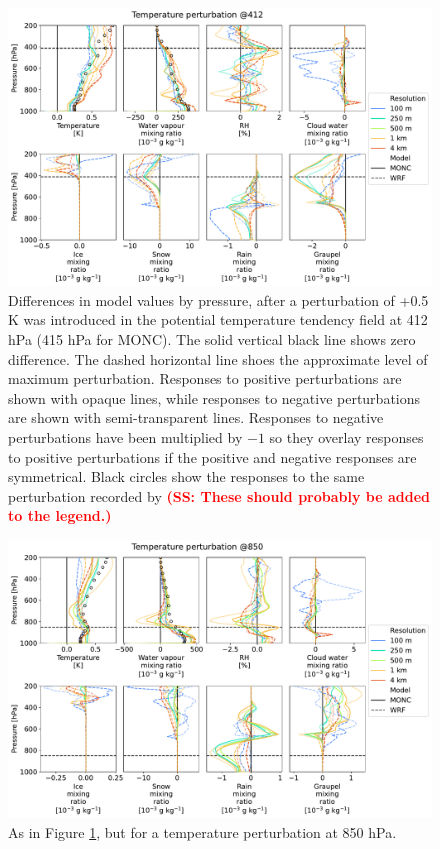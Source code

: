 \documentclass[draft]{agujournal2019}
\newcommand{\todo}[1]{\textcolor{red}{\textbf{(#1)}}}
\begin{document}
\begin{figure}[pth]
    \noindent\includegraphics[width=\textwidth]{figures/pert_diffs_T_0.5_@412}
    \caption{Differences in model values by pressure, after a perturbation of
    +0.5 K was introduced in the potential temperature tendency field at 412 hPa
    (415 hPa for MONC). The solid vertical black line shows zero difference. The
    dashed horizontal line shoes the approximate level of maximum perturbation.
    Responses to positive perturbations are shown with opaque lines, while
    responses to negative perturbations are shown with semi-transparent lines.
    Responses to negative perturbations have been multiplied by $-1$ so they
    overlay responses to positive perturbations if the positive and negative
    responses are symmetrical. Black circles show the responses to the same
    perturbation recorded by  \todo{SS: These should probably be added to the legend.}}
    \label{fig:tpert_412}
\end{figure}

\begin{figure}[pth]
    \noindent\includegraphics[width=\textwidth]{figures/pert_diffs_T_0.5_@850}
    \caption{As in Figure \ref{fig:tpert_412}, but for a temperature
    perturbation at 850 hPa.}
    \label{fig:tpert_850}
\end{figure}
\end{document}
